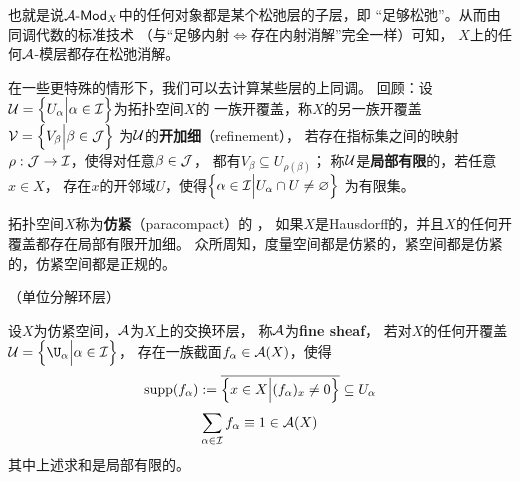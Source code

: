 也就是说$\mathcal{A}\operatorname{\!\text{-}\mathsf{Mod}}_X$中的任何对象都是某个松弛层的子层，即
“足够松弛”。从而由同调代数的标准技术
（与“足够内射$\iff$存在内射消解”完全一样）可知，
$X$上的任何$\mathcal{A}$-模层都存在松弛消解。


在一些更特殊的情形下，我们可以去计算某些层的上同调。
回顾：设$\mathcal{U}=\Big\{ U_\alpha \Big| \alpha\in\mathcal{I} \Big\}$为拓扑空间$X$的
一族开覆盖，称$X$的另一族开覆盖$\mathcal{V}=\Big\{ V_\beta \Big| \beta\in\mathcal{J} \Big\}$
为$\mathcal{U}$的\textbf{开加细}（refinement），
若存在指标集之间的映射$\rho:\mathcal{J}\to\mathcal{I}$，使得对任意$\beta\in\mathcal{J}$，
都有$V_\beta\subseteq U_{\rho(\beta)}$；
称$\mathcal{U}$是\textbf{局部有限}的，若任意$x\in X$，
存在$x$的开邻域$U$，使得$\Big\{ \alpha\in\mathcal{I} \Big| U_\alpha\cap U\neq\varnothing \Big\}$
为有限集。

拓扑空间$X$称为\textbf{仿紧}（paracompact）的
，
如果$X$是Hausdorff的，并且$X$的任何开覆盖都存在局部有限开加细。
众所周知，度量空间都是仿紧的，紧空间都是仿紧的，仿紧空间都是正规的。

\begin{definition}（单位分解环层）%

设$X$为仿紧空间，$\mathcal{A}$为$X$上的交换环层，
称$\mathcal{A}$为\textbf{fine sheaf}，
若对$X$的任何开覆盖$\mcalU=\Bigset{\U_\afa}{\afa\in\mcalI}$，
存在一族截面$f_\alpha\in\mathcal{A}(X)$，使得
$$
  \operatorname{supp}(f_\alpha)
:=
  \overline{\Big\{ x\in X \Big| (f_\alpha)_x\neq 0 \Big\}}
\subseteq U_\alpha
$$
$$
  \sum_{\alpha\in\mathcal{I}}
    f_\alpha
\equiv 1\in\mathcal{A}(X)
$$
其中上述求和是局部有限的。
\end{definition}



